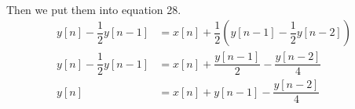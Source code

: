 \documentclass[10pt,a4paper, margin=1in]{article}
\begin{document}
\begin{enumerate}
\begin{equation}
\begin{split}
	\end{split}
	\end{equation}
	Then we put them into equation 28. \\
	\begin{equation}
	\begin{split}
	 y[n] - \dfrac{1}{2}y[n-1] &= x[n]+ \dfrac{1}{2}(y[n-1]- \dfrac{1}{2}y[n-2]) \\
	 y[n] - \dfrac{1}{2}y[n-1] &= x[n] + \dfrac{y[n-1]}{2}- \dfrac{y[n-2]}{4} \\
	 y[n] &= x[n]+y[n-1]- \dfrac{y[n-2]}{4}\\
	 \end{split}
	\end{equation}
	

\end{enumerate}
\end{document}
